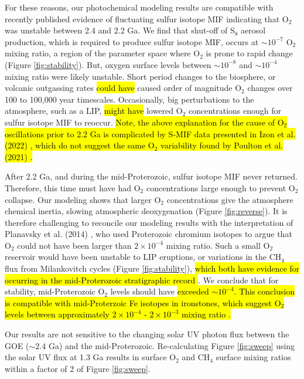 \documentclass[9pt,twocolumn,twoside,lineno]{pnas-new}
\begin{document}
For these reasons, our photochemical modeling results are compatible with recently published evidence of fluctuating sulfur isotope MIF \cite{Poulton_2021, Gumsley_2017} indicating that O$_2$ was unstable between 2.4 and 2.2 Ga. We find that shut-off of S$_8$ aerosol production, which is required to produce sulfur isotope MIF, occurs at $\sim10^{-7}$ O$_2$ mixing ratio, a region of the parameter space where O$_2$ is prone to rapid change (Figure \ref{fig:stability}). But, oxygen surface levels between $\sim10^{-8}$ and $\sim10^{-4}$ mixing ratio were likely unstable. Short period changes to the biosphere, or volcanic outgassing rates \hl{could have} caused order of magnitude O$_2$ changes over 100 to 100,000 year timescales. Occasionally, big perturbations to the atmosphere, such as a LIP, \hl{might have} lowered O$_2$ concentrations enough for sulfur isotope MIF to reoccur. \hl{Note, the above explanation for the cause of O$_2$ oscillations prior to 2.2 Ga is complicated by S-MIF data presented in Izon et al. (2022) \mbox{\cite{Izon_2022}}, which do not suggest the same O$_2$ variability found by Poulton et al. (2021) \mbox{\cite{Poulton_2021}}.}

After 2.2 Ga, and during the mid-Proterozoic, sulfur isotope MIF never returned. Therefore, this time must have had O$_2$ concentrations large enough to prevent O$_2$ collapse. Our modeling shows that larger O$_2$ concentrations give the atmosphere chemical inertia, slowing atmospheric deoxygenation (Figure \ref{fig:reverse}). It is therefore challenging to reconcile our modeling results with the interpretation of Planavsky et al. (2014) \cite{Planavsky_2014}, who used Proterozoic chromium isotopes to argue that O$_2$ could not have been larger than $2 \times 10^{-4}$ mixing ratio. Such a small O$_2$ reservoir would have been unstable to LIP eruptions, or variations in the CH$_4$ flux from Milankovitch cycles (Figure \ref{fig:stability}), \hl{which both have evidence for occurring in the mid-Proterozoic stratigraphic record \mbox{\cite{Zhang_2015,Meyers_2018,Lecheminant_1989}}}. We conclude that for stability, mid-Proterozoic O$_2$ levels should have \hl{exceeded $\sim 10^{-4}$. This conclusion is compatible with mid-Proterzoic Fe isotopes in ironstones, which suggest O$_2$ levels between approximately $2 \times 10^{-4}$ - $2 \times 10^{-3}$ mixing ratio \mbox{\cite{Wang_2022}}.}

Our results are not sensitive to the changing solar UV photon flux between the GOE ($\sim 2.4$ Ga) and the mid-Proterozoic. Re-calculating Figure \ref{fig:sweep} using the solar UV flux at 1.3 Ga \cite{Claire_2012} results in surface O$_2$ and CH$_4$ surface mixing ratios within a factor of 2 of Figure \ref{fig:sweep}.
\end{document}
